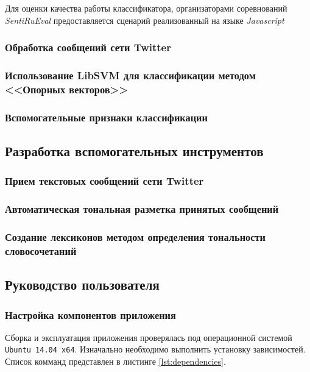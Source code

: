         Для оценки качества работы классификатора, организаторами соревнований
        {\it SentiRuEval} предоставляется сценарий реализованный на языке {\it Javascript}

        \subsubsection{Обработка сообщений сети Twitter}


        \subsubsection{Использование LibSVM для классификации методом <<Опорных векторов>>}

        \subsubsection{Вспомогательные признаки классификации}

    \subsection{Разработка вспомогательных инструментов}
        \subsubsection{Прием текстовых сообщений сети Twitter}

        \subsubsection{Автоматическая тональная разметка принятых сообщений}

        \subsubsection{Создание лексиконов методом определения тональности словосочетаний}

    \subsection{Руководство пользователя}
        \subsubsection{Настройка компонентов приложения}
        Сборка и эксплуатация приложения проверялась под операционной системой
        {\tt Ubuntu 14.04 x64}. Изначально необходимо выполнить установку зависимостей.
        Список комманд представлен в листинге \ref{lst:dependencies}.
        \lstset{style=bash}
        

